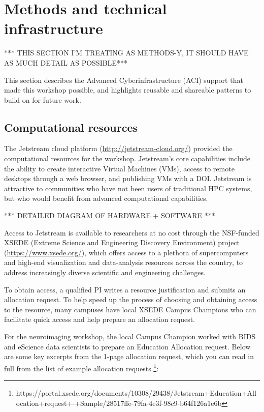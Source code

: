 \section{Methods and technical infrastructure}\label{sec:methods}

*** THIS SECTION I'M TREATING AS METHODS-Y, IT SHOULD HAVE AS MUCH DETAIL AS POSSIBLE***

This section describes the Advanced Cyberinfrastructure (ACI) support that made
this workshop possible, and highlights reusable and shareable patterns to build
on for future work.

\subsection{Computational resources}

The Jetstream cloud platform (\url{http://jetstream-cloud.org/}) provided the
computational resources for the workshop. Jetstream’s core capabilities include
the ability to create interactive Virtual Machines (VMs), access to remote
desktops through a web browser, and publishing VMs with a DOI. Jetstream is
attractive to communities who have not been users of traditional HPC systems,
but who would benefit from advanced computational capabilities.

*** DETAILED DIAGRAM OF HARDWARE + SOFTWARE ***

Access to Jetstream is available to researchers at no cost through the
NSF-funded XSEDE (Extreme Science and Engineering Discovery Environment) project
(\url{https://www.xsede.org/}), which offers access to a plethora of
supercomputers and high-end visualization and data-analysis resources across the
country, to address increasingly diverse scientific and engineering challenges.

To obtain access, a qualified PI writes a resource justification and submits an
allocation request. To help speed up the process of choosing and obtaining
access to the resource, many campuses have local XSEDE Campus Champions who can
facilitate quick access and help prepare an allocation request.

For the neuroimaging workshop, the local Campus Champion worked with BIDS and
eScience data scientists to prepare an Education Allocation request. Below are
some key excerpts from the 1-page allocation request, which you can read in full
from the list of example allocation requests \footnote{https://portal.xsede.org/documents/10308/29438/Jetstream+Education+Allocation+request+-+Sample/28517ffe-79fa-4e3f-98c9-b64f126a1e6b}:

